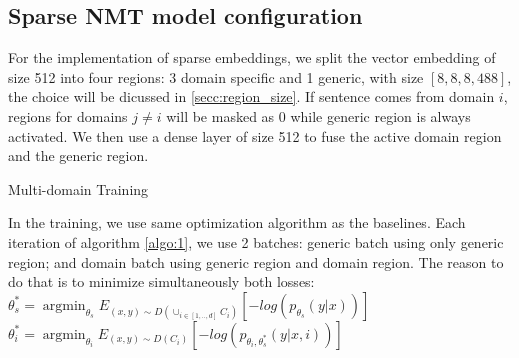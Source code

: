 \documentclass[11pt,a4paper]{article}
\DeclareMathOperator*{\argmin}{argmin}
\newcommand{\fyTodo}[1]{\Todo[FY:]{\textcolor{orange}{#1}}}
\begin{document}
\subsection{Sparse NMT model configuration}
\fyTodo{Motivate the split - discuss experimentally embedding size}
For the implementation of sparse embeddings, we split the vector embedding of size 512 into four regions: 3 domain specific and 1 generic, with size $[8,8,8,488]$, the choice will be dicussed in \ref{secc:region_size}. If sentence comes from domain $i$, regions for domains $j \neq i$ will be masked as 0 while generic region is always activated. We then use a dense layer of size 512 to fuse the active domain region and the generic region.

\begin{algorithm}[h]
\caption{Multi-domain Training}
\label{algo:1}
\begin{algorithmic}[1]
\REPEAT 
{}
\end{algorithmic}
\end{algorithm}

In the training, we use same optimization algorithm as the baselines.
Each iteration of algorithm \ref{algo:1}, we use 2 batches: generic batch using only generic region; and domain batch using generic region and domain region. The reason to do that is to minimize simultaneously both losses: \\
$\theta^*_{s}=\displaystyle{\mathop{\argmin}_{\theta_s}}E_{(x,y) \sim D(\displaystyle{\mathop{\cup}_{i \in [1,..,d]}}C_{i})}[-log(p_{\theta_s}(y|x))]$ \\ 
$ \theta^*_{i}=\displaystyle{\mathop{\argmin}_{\theta_i}}E_{(x,y) \sim D(C_{i})}[-log(p_{\theta_i,\theta^*_s}(y|x,i))]
$ 
\end{document}
